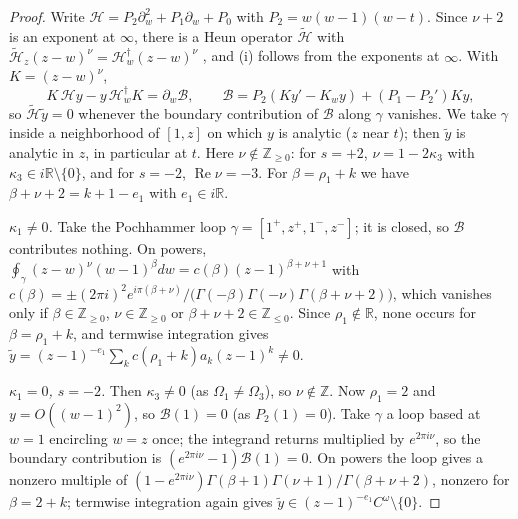 \documentclass[11pt]{amsart}
\theoremstyle{definition}
\theoremstyle{remark}
\numberwithin{equation}{section}
\newcommand{\R}{\mathbb{R}}
\newcommand{\Z}{\mathbb{Z}}
\renewcommand{\Re}{\operatorname{Re}}
\begin{document}
\begin{proof}
Write $\mathcal H=P_2\partial_w^2+P_1\partial_w+P_0$ with $P_2=w(w-1)(w-t)$. Since $\nu+2$ is an exponent at $\infty$, there
is a Heun operator $\widetilde{\mathcal H}$ with $\widetilde{\mathcal H}_z(z-w)^\nu=\mathcal H_w^\dagger(z-w)^\nu$
\cite{KS96,Tak03}, and (i) follows from the exponents at $\infty$. With $K=(z-w)^\nu$,
\[
K\,\mathcal Hy-y\,\mathcal H_w^\dagger K=\partial_w\mathcal B,\qquad\mathcal B=P_2(Ky'-K_wy)+(P_1-P_2')Ky,
\]
so $\widetilde{\mathcal H}\tilde y=0$ whenever the boundary contribution of $\mathcal B$ along $\gamma$ vanishes. We
take $\gamma$ inside a neighborhood of $[1,z]$ on which $y$ is analytic ($z$ near $t$); then $\tilde y$ is analytic in
$z$, in particular at $t$. Here $\nu\notin\Z_{\ge0}$: for $s=+2$, $\nu=1-2\kappa_3$ with
$\kappa_3\in i\R\setminus\{0\}$, and for $s=-2$, $\Re\nu=-3$. For $\beta=\rho_1+k$ we have $\beta+\nu+2=k+1-e_1$ with
$e_1\in i\R$.

\emph{$\kappa_1\ne0$.} Take the Pochhammer loop $\gamma=[1^+,z^+,1^-,z^-]$; it is closed, so $\mathcal B$ contributes
nothing. On powers, $\oint_\gamma(z-w)^\nu(w-1)^\beta dw=c(\beta)(z-1)^{\beta+\nu+1}$ with
$c(\beta)=\pm(2\pi i)^2e^{i\pi(\beta+\nu)}/\big(\Gamma(-\beta)\Gamma(-\nu)\Gamma(\beta+\nu+2)\big)$, which vanishes only if
$\beta\in\Z_{\ge0}$, $\nu\in\Z_{\ge0}$ or $\beta+\nu+2\in\Z_{\le0}$. Since $\rho_1\notin\R$, none occurs for
$\beta=\rho_1+k$, and termwise integration gives $\tilde y=(z-1)^{-e_1}\sum_kc(\rho_1+k)a_k(z-1)^k\ne0$.

\emph{$\kappa_1=0$, $s=-2$.} Then $\kappa_3\ne0$ (as $\Omega_1\ne\Omega_3$), so $\nu\notin\Z$. Now $\rho_1=2$ and $y=O((w-1)^2)$, so $\mathcal B(1)=0$ (as $P_2(1)=0$). Take $\gamma$ a
loop based at $w=1$ encircling $w=z$ once; the integrand returns multiplied by $e^{2\pi i\nu}$, so the boundary
contribution is $(e^{2\pi i\nu}-1)\mathcal B(1)=0$. On powers the loop gives a nonzero multiple of
$(1-e^{2\pi i\nu})\Gamma(\beta+1)\Gamma(\nu+1)/\Gamma(\beta+\nu+2)$, nonzero for $\beta=2+k$; termwise integration again
gives $\tilde y\in(z-1)^{-e_1}C^\omega\setminus\{0\}$.
\end{proof}
\end{document}
